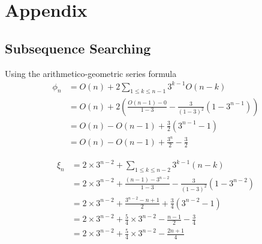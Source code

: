 \chapter*{Appendix} \label{chap:appendix}

\section{Subsequence Searching}


Using the arithmetico-geometric series formula
\label{app:phi}
\begin{align*}
	\phi_n &= O(n) + 2\sum_{1\le k\le n-1}3^{k-1}O(n-k)\\
&= O(n) + 2\left(\frac{O(n-1) - 0}{1-3} - \frac{3}{(1-3)^2}(1-3^{n-1})\right)\\
&= O(n) - O(n-1) + \frac{3}{2}(3^{n-1}-1)\\
&= O(n) - O(n-1) + \frac{3^n}{2} - \frac{3}{2}
\end{align*}

\label{app:xi}
\begin{align*}
	\xi_n &= 2\times 3^{n-2}+\sum_{1\le k\le n-2}3^{k-1}(n-k)\\
	&= 2\times 3^{n-2} + \frac{(n-1)-3^{n-2}}{1-3}-\frac{3}{(1-3)^2}(1-3^{n-2})\\
	&= 2\times 3^{n-2} + \frac{3^{n-2}-n+1}{2}+\frac{3}{4}(3^{n-2}-1)\\
	&= 2\times 3^{n-2} + \frac{5}{4}\times 3^{n-2}-\frac{n-1}{2}-\frac{3}{4}\\
	&= 2\times 3^{n-2}+\frac{5}{4}\times 3^{n-2}-\frac{2n+1}{4}
\end{align*}
